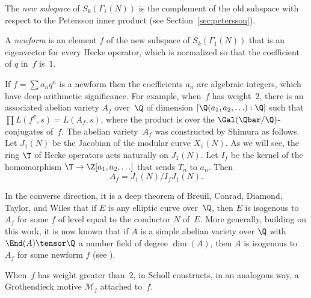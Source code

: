 \documentclass{report}
\begin{document}
\begin{definition}
  The {\em new subspace} of $S_k(\Gamma_1(N))$ is the complement of
  the old subspace with respect to the Petersson inner product (see
  Section~\ref{sec:petersson}).
\end{definition}



\begin{definition}[Newform]
A {\em newform} is an element $f$ of the new subspace of
$S_k(\Gamma_1(N))$ that is an eigenvector for every Hecke
operator, which is normalized so that the coefficient of $q$
in~$f$ is~$1$.
\end{definition}

If $f=\sum a_n q^n$ is a newform then the coefficients $a_n$ are
algebraic integers, which have deep arithmetic significance. For
example, when~$f$ has weight~$2$, there is an associated abelian
variety $A_f$ over~$\Q$ of dimension $[\Q(a_1,a_2,\ldots):\Q]$ such
that $\prod L(f^{\sigma},s)=L(A_f,s)$, where the product is over the
$\Gal(\Qbar/\Q)$-conjugates of~$f$.  The abelian variety~$A_f$ was
constructed by Shimura as follows.  Let $J_1(N)$ be the Jacobian of
the modular curve $X_1(N)$.  As we will see, the ring $\T$ of Hecke
operators acts naturally on $J_1(N)$.  Let $I_f$ be the kernel of the
homomorphism $\T\to \Z[a_1,a_2,\ldots]$ that sends $T_n$ to $a_n$.
Then
\[
    A_f = J_1(N)/I_f J_1(N).
\]

In the converse direction, it is a deep theorem of Breuil, Conrad,
Diamond, Taylor, and Wiles that if $E$ is any elliptic curve
over~$\Q$, then $E$ is isogenous to $A_f$ for some $f$ of level equal
to the conductor $N$ of~$E$.  More generally, building on this work,
it is now known that if $A$ is a simple abelian variety over $\Q$ with
$\End(A)\tensor\Q$ a number field of degree $\dim(A)$, then $A$ is
isogenous to $A_f$ for some newform $f$ (see \cite{ribet:abvars,
  khare-wintenberger:serre1}).

When~$f$ has weight greater than~$2$, in \cite{scholl:motivesinvent}
Scholl constructs, in an analogous way, a Grothendieck motive
$\mathcal{M}_f$ attached to~$f$.
\end{document}
